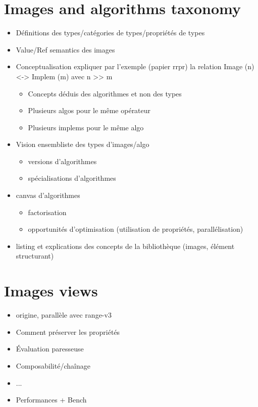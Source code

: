 \documentclass{book}
\begin{document}
\chapter{Images and algorithms taxonomy}

\begin{itemize}
\item Définitions des types/catégories de types/propriétés de types
\item Value/Ref semantics des images
\item Conceptualisation expliquer par l'exemple (papier rrpr) la relation Image (n) <-> Implem (m) avec n >> m
  \begin{itemize}
  \item Concepts déduis des algorithmes et non des types
  \item Plusieurs algos pour le même opérateur
  \item Plusieurs implems pour le même algo
  \end{itemize}
\item Vision ensembliste des types d'images/algo
  \begin{itemize}
  \item versions d'algorithmes
  \item spécialisations d'algorithmes
  \end{itemize}
\item canvas d'algorithmes
  \begin{itemize}
  \item factorisation
  \item opportunités d'optimisation (utilisation de propriétés, parallélisation)
  \end{itemize}
\item listing et explications des concepts de la bibliothèque (images, élément structurant)
\end{itemize}

\cleardoublepage


\chapter{Images views}

\begin{itemize}
\item origine, parallèle avec range-v3
\item Comment préserver les propriétés
\item Évaluation paresseuse
\item Composabilité/chaînage
\item ...
\item Performances + Bench
\end{itemize}
\end{document}
